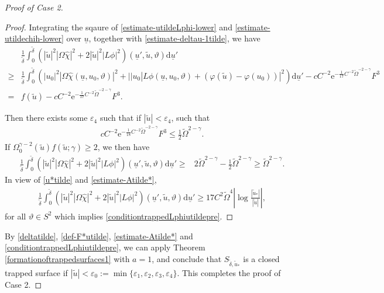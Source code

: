 \documentclass[11pt,reqno]{amsart}
\theoremstyle{definition}
\numberwithin{equation}{section}
\newcommand{\D}{\mathrm{d}}
\def\chih{\widehat{\chi}}
\def\ub{\underline{u}}
\newcommand{\tdelta}{\widetilde{\delta}}
\newcommand{\tOmega}{\widetilde{\Omega}}
\newcommand{\tu}{\widetilde{u}}
\begin{document}
\begin{proof}[Proof of Case 2]
\begin{proof}
Integrating the sqaure of \eqref{estimate-utildeLphi-lower} and \eqref{estimate-utildechih-lower} over $\ub$, together with \eqref{estimate-deltau-1tilde}, we have
\begin{align*}
&\frac{1}{\tdelta}\int_0^{\tdelta}(|\tu|^2|\Omega\chih|^2+2|\tu|^2|L\phi|^2)(\ub',\tu,\vartheta)\D\ub'\\
\ge&\frac{1}{\tdelta}\int_0^{\tdelta}(|u_0|^2|\Omega\chih(\ub,u_0,\vartheta)|^2+||u_0|L\phi(\ub,u_0,\vartheta)+(\varphi(\tu)-\varphi(u_0))|^2)\D\ub'-c C^{-2}\mathrm{e}^{-\frac{1}{17}C^{-2}\widetilde{\Omega}^{-2-\gamma}}F^3\\
=& f(\tu)-c C^{-2}\mathrm{e}^{-\frac{1}{17}C^{-2}\widetilde{\Omega}^{-2-\gamma}}F^3.
\end{align*}

Then there exists some $\varepsilon_4$ such that if $|\tu|<\varepsilon_4$, such that 
\begin{align*}
cC^{-2}\mathrm{e}^{-\frac{1}{18}C^{-2}\widetilde{\Omega}^{-2-\gamma}}F^3\le\frac{1}{2}\tOmega^{2-\gamma}.
\end{align*}
If $\Omega_0^{\gamma-2}(\widetilde{u})f(\tu;\gamma)\ge2$, we then have
 \begin{align*}
\frac{1}{\tdelta}\int_0^{\tdelta}(|\tu|^2|\Omega\chih|^2+2|\tu|^2|L\phi|^2)(\ub',\tu,\vartheta)\D\ub'\ge&2\tOmega^{2-\gamma}-\frac{1}{2}\tOmega^{2-\gamma}\ge\tOmega^{2-\gamma}.
\end{align*}
In view of \eqref{u*tilde} and \eqref{estimate-Atilde*},
 \begin{align*}
\frac{1}{\tdelta}\int_0^{\tdelta}(|\tu|^2|\Omega\chih|^2+2|\tu|^2|L\phi|^2)(\ub',\tu,\vartheta)\D\ub'\ge 17C^2\tOmega^4\left|\log\frac{|\tu_*|}{|\tu|}\right|,
\end{align*}
for all $\vartheta\in S^2$ which implies \eqref{conditiontrappedLphiutildepre}.
\end{proof}
By \eqref{deltatilde}, \eqref{def-F*utilde}, \eqref{estimate-Atilde*} and \eqref{conditiontrappedLphiutildepre}, we can apply Theorem \ref{formationoftrappedsurfaces1} with $a=1$, and conclude that $S_{\tdelta,\tu_*}$ is a closed trapped surface if $|\tu|<\varepsilon_0:=\min\{\varepsilon_1,\varepsilon_2,\varepsilon_3,\varepsilon_4\}$. This completes the proof of Case 2.

\end{proof}
\end{document}
